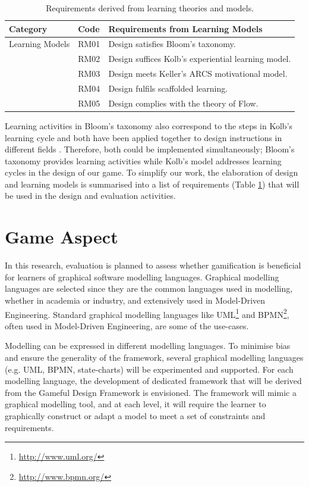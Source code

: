\documentclass[12pt, a4paper]{report} \usepackage[titletoc]{appendix}
\begin{document}
\begin{appendices}
\begin{table}[ht]
\caption{Requirements derived from learning theories and models.}
\label{design-learning-models}
\begin{center}
\begin{tabular}{ p{2cm}p{1cm}p{10cm} } 
\hline
Category & Code & Requirements from Learning Models \\
\hline
\multirow{1}{2cm}{Learning Models} 
& RM01 & Design satisfies Bloom's taxonomy. \\
& RM02 & Design suffices Kolb's experiential learning model. \\ 
& RM03 & Design meets Keller's ARCS motivational model. \\
& RM04 & Design fulfils scaffolded learning. \\
& RM05 & Design complies with the theory of Flow. \\ 
\hline
\end{tabular}
\end{center}
\end{table}

Learning activities in Bloom's taxonomy also correspond to the steps in Kolb's learning cycle \cite{murphy2007prior} and both have been applied together to design instructions in different fields \cite{terry1993kolb, howard1996felder, schatzberg2002applying}. Therefore, both could be implemented simultaneously; Bloom's taxonomy provides learning activities while Kolb's model addresses learning cycles in the design of our game. To simplify our work, the elaboration of design and learning models is summarised into a list of requirements (Table \ref{design-learning-models}) that will be used in the design and evaluation activities.

\section{Game Aspect}
In this research, evaluation is planned to assess whether gamification is beneficial for learners of graphical software modelling languages. Graphical modelling languages are selected since they are the common languages used in modelling, whether in academia or industry, and extensively used in Model-Driven Engineering. Standard graphical modelling languages like UML\footnote{\url{http://www.uml.org/}} and BPMN\footnote{\url{http://www.bpmn.org/}}, often used in Model-Driven Engineering, are some of the use-cases. 

Modelling can be expressed in different modelling languages. To minimise bias and ensure the generality of the framework, several graphical modelling languages (e.g. UML, BPMN, state-charts) will be experimented and supported. For each modelling language, the development of dedicated framework that will be derived from the Gameful Design Framework \cite{deterding2015lens} is envisioned. The framework will mimic a graphical modelling tool, and at each level, it will require the learner to graphically construct or adapt a model to meet a set of constraints and requirements.


\end{appendices}
\end{document}
